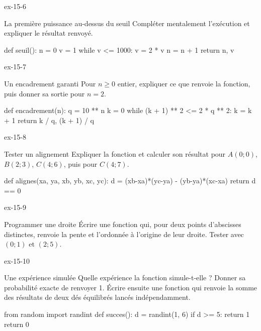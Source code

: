\clearpage{}
\begin{blocLivre}{ex-15-6}
\begin{exercice}[2]{La première puissance au-dessus du seuil}
Compléter mentalement l’exécution et expliquer le résultat renvoyé.
\begin{python}
def seuil():
    n = 0
    v = 1
    while v <= 1000:
        v = 2 * v
        n = n + 1
    return n, v
\end{python}
\end{exercice}
\end{blocLivre}
\begin{blocLivre}{ex-15-7}
\begin{exercice}[2]{Un encadrement garanti}
Pour $n\ge0$ entier, expliquer ce que renvoie la fonction, puis donner sa sortie pour $n=2$.
\begin{python}
def encadrement(n):
    q = 10 ** n
    k = 0
    while (k + 1) ** 2 <= 2 * q ** 2:
        k = k + 1
    return k / q, (k + 1) / q
\end{python}
\end{exercice}
\end{blocLivre}
\begin{blocLivre}{ex-15-8}
\begin{exercice}[2]{Tester un alignement}
Expliquer la fonction et calculer son résultat pour $A(0;0)$, $B(2;3)$, $C(4;6)$, puis pour $C(4;7)$.
\begin{python}
def alignes(xa, ya, xb, yb, xc, yc):
    d = (xb-xa)*(yc-ya) - (yb-ya)*(xc-xa)
    return d == 0
\end{python}
\end{exercice}
\end{blocLivre}
\begin{blocLivre}{ex-15-9}
\begin{exercice}[2]{Programmer une droite}
Écrire une fonction qui, pour deux points d’abscisses distinctes, renvoie la pente et l’ordonnée à l’origine de leur droite. Tester avec $(0;1)$ et $(2;5)$.
\end{exercice}
\end{blocLivre}
\begin{blocLivre}{ex-15-10}
\begin{exercice}[2]{Une expérience simulée}
Quelle expérience la fonction simule-t-elle ? Donner sa probabilité exacte de renvoyer 1. Écrire ensuite une fonction  qui renvoie la somme des résultats de deux dés équilibrés lancés indépendamment.
\begin{python}
from random import randint
def succes():
    d = randint(1, 6)
    if d >= 5:
        return 1
    return 0
\end{python}
\end{exercice}
\end{blocLivre}

